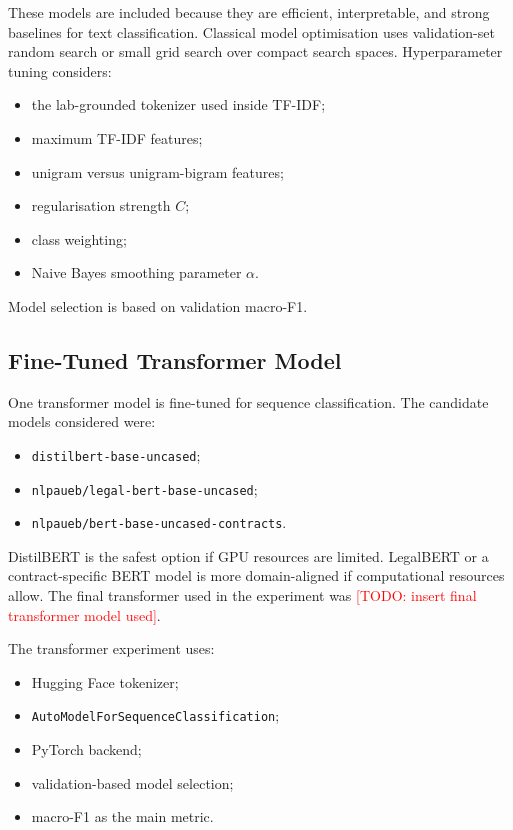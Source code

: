 \documentclass[11pt]{article}
\newcommand{\todo}[1]{\textcolor{red}{[TODO: #1]}}
\begin{document}
These models are included because they are efficient, interpretable, and strong baselines for text classification. Classical model optimisation uses validation-set random search or small grid search over compact search spaces. Hyperparameter tuning considers:

\begin{itemize}[leftmargin=*]
    \item the lab-grounded tokenizer used inside TF-IDF;
    \item maximum TF-IDF features;
    \item unigram versus unigram-bigram features;
    \item regularisation strength \(C\);
    \item class weighting;
    \item Naive Bayes smoothing parameter \(\alpha\).
\end{itemize}

Model selection is based on validation macro-F1.

\subsection{Fine-Tuned Transformer Model}

One transformer model is fine-tuned for sequence classification. The candidate models considered were:

\begin{itemize}[leftmargin=*]
    \item \texttt{distilbert-base-uncased};
    \item \texttt{nlpaueb/legal-bert-base-uncased};
    \item \texttt{nlpaueb/bert-base-uncased-contracts}.
\end{itemize}

DistilBERT is the safest option if GPU resources are limited. LegalBERT or a contract-specific BERT model is more domain-aligned if computational resources allow. The final transformer used in the experiment was \todo{insert final transformer model used}.

The transformer experiment uses:

\begin{itemize}[leftmargin=*]
    \item Hugging Face tokenizer;
    \item \texttt{AutoModelForSequenceClassification};
    \item PyTorch backend;
    \item validation-based model selection;
    \item macro-F1 as the main metric.
\end{itemize}
\end{document}

